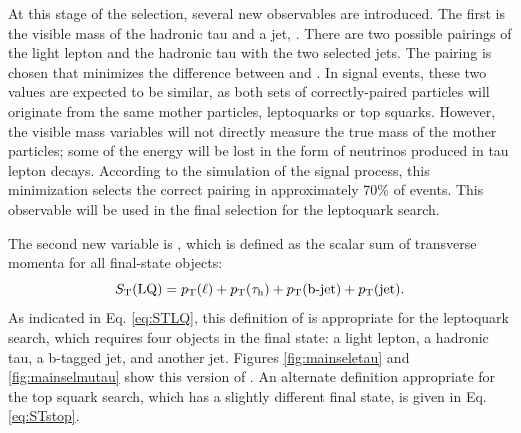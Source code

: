 At this stage of the selection, several new observables are introduced. The first is the visible mass of the hadronic tau and a jet, \MassTJ. There are two possible pairings of the light lepton and the hadronic tau with the two selected jets. The pairing is chosen that minimizes the difference between \MassTJ and \MassLJ. In signal events, these two values are expected to be similar, as both sets of correctly-paired particles will originate from the same mother particles, leptoquarks or top squarks. However, the visible mass variables will not directly measure the true mass of the mother particles; some of the energy will be lost in the form of neutrinos produced in tau lepton decays. According to the simulation of the signal process, this minimization selects the correct pairing in approximately 70\% of events. This observable will be used in the final selection for the leptoquark search.

The second new variable is \ST, which is defined as the scalar sum of transverse momenta for all final-state objects:
\begin{equation}
\label{eq:STLQ}
S_{\text{T}}(\text{LQ}) = p_{\mathrm{T}}(\ell) + p_{\mathrm{T}}(\tau_{\text{h}}) + p_{\mathrm{T}}(\text{b-jet}) + p_{\mathrm{T}}(\text{jet}).
\end{equation}
As indicated in Eq. \eqref{eq:STLQ}, this definition of \ST is appropriate for the leptoquark search, which requires four objects in the final state: a light lepton, a hadronic tau, a b-tagged jet, and another jet. Figures \ref{fig:mainseletau} and \ref{fig:mainselmutau} show this version of \ST. An alternate definition appropriate for the top squark search, which has a slightly different final state, is given in Eq. \eqref{eq:STstop}.

